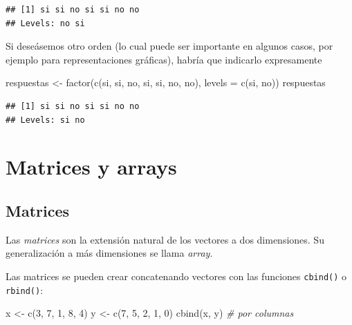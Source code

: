 \documentclass[
]{book}
\newenvironment{Shaded}{\begin{snugshade}}{\end{snugshade}}
\newcommand{\AttributeTok}[1]{\textcolor[rgb]{0.77,0.63,0.00}{#1}}
\newcommand{\CommentTok}[1]{\textcolor[rgb]{0.56,0.35,0.01}{\textit{#1}}}
\newcommand{\DecValTok}[1]{\textcolor[rgb]{0.00,0.00,0.81}{#1}}
\newcommand{\FunctionTok}[1]{\textcolor[rgb]{0.00,0.00,0.00}{#1}}
\newcommand{\NormalTok}[1]{#1}
\newcommand{\OtherTok}[1]{\textcolor[rgb]{0.56,0.35,0.01}{#1}}
\newcommand{\StringTok}[1]{\textcolor[rgb]{0.31,0.60,0.02}{#1}}
\theoremstyle{break}
\theoremstyle{nonumberplain}
\begin{document}
\begin{verbatim}
## [1] si si no si si no no
## Levels: no si
\end{verbatim}

Si deseásemos otro orden (lo cual puede ser importante en algunos casos, por ejemplo para representaciones gráficas), habría que indicarlo expresamente

\begin{Shaded}
\begin{Highlighting}[]
\NormalTok{respuestas }\OtherTok{\textless{}{-}} \FunctionTok{factor}\NormalTok{(}\FunctionTok{c}\NormalTok{(}\StringTok{\textquotesingle{}si\textquotesingle{}}\NormalTok{, }\StringTok{\textquotesingle{}si\textquotesingle{}}\NormalTok{, }\StringTok{\textquotesingle{}no\textquotesingle{}}\NormalTok{, }\StringTok{\textquotesingle{}si\textquotesingle{}}\NormalTok{, }\StringTok{\textquotesingle{}si\textquotesingle{}}\NormalTok{, }\StringTok{\textquotesingle{}no\textquotesingle{}}\NormalTok{, }\StringTok{\textquotesingle{}no\textquotesingle{}}\NormalTok{), }\AttributeTok{levels =} \FunctionTok{c}\NormalTok{(}\StringTok{\textquotesingle{}si\textquotesingle{}}\NormalTok{, }\StringTok{\textquotesingle{}no\textquotesingle{}}\NormalTok{))}
\NormalTok{respuestas}
\end{Highlighting}
\end{Shaded}

\begin{verbatim}
## [1] si si no si si no no
## Levels: si no
\end{verbatim}

\hypertarget{matrices-y-arrays}{%
\section{Matrices y arrays}\label{matrices-y-arrays}}

\hypertarget{matrices}{%
\subsection{Matrices}\label{matrices}}

Las \emph{matrices} son la extensión natural de los vectores a dos dimensiones.
Su generalización a más dimensiones se llama \emph{array}.

Las matrices se pueden crear concatenando vectores con las funciones \texttt{cbind()} o \texttt{rbind()}:

\begin{Shaded}
\begin{Highlighting}[]
\NormalTok{x }\OtherTok{\textless{}{-}} \FunctionTok{c}\NormalTok{(}\DecValTok{3}\NormalTok{, }\DecValTok{7}\NormalTok{, }\DecValTok{1}\NormalTok{, }\DecValTok{8}\NormalTok{, }\DecValTok{4}\NormalTok{)}
\NormalTok{y }\OtherTok{\textless{}{-}} \FunctionTok{c}\NormalTok{(}\DecValTok{7}\NormalTok{, }\DecValTok{5}\NormalTok{, }\DecValTok{2}\NormalTok{, }\DecValTok{1}\NormalTok{, }\DecValTok{0}\NormalTok{)}
\FunctionTok{cbind}\NormalTok{(x, y)  }\CommentTok{\# por columnas}
\end{Highlighting}
\end{Shaded}
\end{document}
